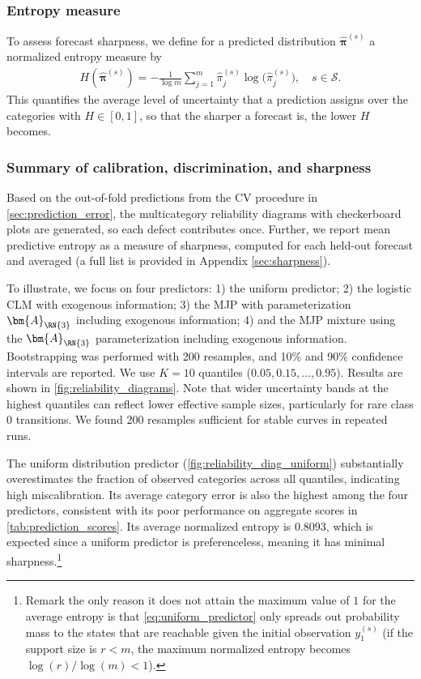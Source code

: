 \subsubsection{Entropy measure}
To assess forecast sharpness, we define for a predicted distribution $\widehat{\bm\pi}^{(s)}$ a normalized entropy measure by
\begin{align}
H(\widehat{\bm\pi}^{(s)}) = - \frac{1}{\log m}\sum_{j=1}^{m}\widehat{\pi}^{(s)}_j \log\!\big(\widehat{\pi}^{(s)}_j\big), \quad s \in \mathcal S.\label{eq:entropy}
\end{align}
This quantifies the average level of uncertainty that a prediction assigns over the categories with $H \in [0,1]$, so that the sharper a forecast is, the lower $H$ becomes.

\subsubsection{Summary of calibration, discrimination, and sharpness}
Based on the out-of-fold predictions from the CV procedure in \cref{sec:prediction_error}, the multicategory reliability diagrams with checkerboard plots are generated, so each defect contributes once. Further, we report mean predictive entropy as a measure of sharpness, computed for each held-out forecast and averaged (a full list is provided in Appendix \ref{sec:sharpness}).

To illustrate, we focus on four predictors: 
1) the uniform predictor; 
2) the logistic CLM with exogenous information; 
3) the MJP with parameterization $\bm{A}_{\RN{3}}$ including exogenous information;
4) and the MJP mixture using the $\bm{A}_{\RN{3}}$ parameterization including exogenous information. 
Bootstrapping was performed with 200 resamples, and 10\% and 90\% confidence intervals are reported. We use $K = 10$ quantiles ($0.05, 0.15, \dots, 0.95$). Results are shown in \cref{fig:reliability_diagrams}.
Note that wider uncertainty bands at the highest quantiles can reflect lower effective sample sizes, particularly for rare class $0$ transitions. We found 200 resamples sufficient for stable curves in repeated runs.




The uniform distribution predictor (\cref{fig:reliability_diag_uniform}) substantially overestimates the fraction of observed categories across all quantiles, indicating high miscalibration.
Its average category error is also the highest among the four predictors, consistent with its poor performance on aggregate scores in \cref{tab:prediction_scores}. Its average normalized entropy is $0.8093$, which is expected since a uniform predictor is preferenceless, meaning it has minimal sharpness.\footnote{Remark the only reason it does not attain the maximum value of $1$ for the average entropy is that \cref{eq:uniform_predictor} only spreads out probability mass to the states that are reachable given the initial observation $y_1^{(s)}$ (if the support size is $r<m$, the maximum normalized entropy becomes $\log(r)/\log(m) < 1$).}

